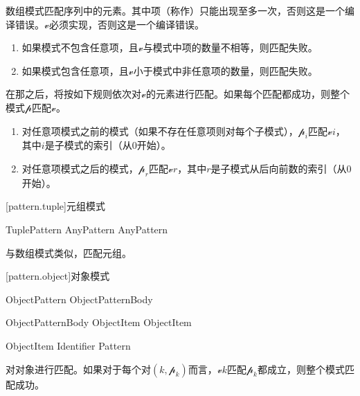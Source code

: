 \pnum
数组模式匹配序列中的元素。其中项（称作）只能出现至多一次，否则这是一个编译错误。$\mathcal{v}$必须实现，否则这是一个编译错误。

\begin{enumerate}
    \item 如果模式不包含任意项，且$\mathcal{v}$与模式中项的数量不相等，则匹配失败。
    \item 如果模式包含任意项，且$\mathcal{v}$小于模式中非任意项的数量，则匹配失败。
\end{enumerate}

\pnum
在那之后，将按如下规则依次对$\mathcal{v}$的元素进行匹配。如果每个匹配都成功，则整个模式$\mathcal{p}$匹配$\mathcal{v}$。

\begin{enumerate}
    \item 对任意项模式之前的模式（如果不存在任意项则对每个子模式），$\mathcal{p}_i$匹配$\mathcal{v}$\tcode{[}$i$\tcode{]}，其中$i$是子模式的索引（从0开始）。
    \item 对任意项模式之后的模式，$\mathcal{p}_r$匹配$\mathcal{v}$\tcode{[\$-}$r$\tcode{]}，其中$r$是子模式从后向前数的索引（从0开始）。
\end{enumerate}

[pattern.tuple]{元组模式}

\begin{bnf}{TuplePattern}
    \terminal{(} AnyPattern \bnflp\terminal{,} AnyPattern\bnfrp\bnfs\ \terminal{)}
\end{bnf}

\pnum
与数组模式类似，匹配元组。

[pattern.object]{对象模式}

\begin{bnf}{ObjectPattern}
    \terminal{\{} ObjectPatternBody \terminal{\}}
\end{bnf}

\begin{bnf}{ObjectPatternBody}
    ObjectItem \bnflp\terminal{,} ObjectItem\bnfrp\bnfs
\end{bnf}

\begin{bnf}{ObjectItem}
    Identifier \terminal{:} Pattern
\end{bnf}

\pnum
{}对对象进行匹配。如果对于每个对$(k, \mathcal{p}_k)$而言，$\mathcal{v}$$k$匹配$\mathcal{p}_k$都成立，则整个模式匹配成功。

